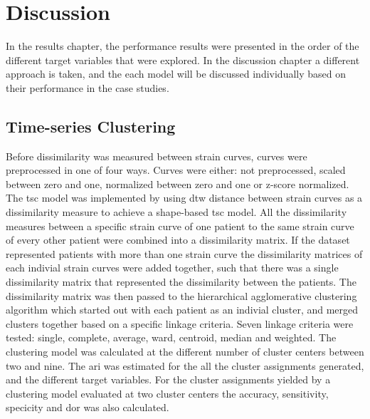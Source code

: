 \chapter{Discussion} \label{chap:discussion}

In the results chapter, the performance results were presented in the order of the different target variables that were explored. In the discussion chapter a different approach is taken, and the each model will be discussed individually based on their performance in the case studies.

\section{Time-series Clustering} \label{sec:disc_tsc}

Before dissimilarity was measured between strain curves, curves were preprocessed in one of four ways. 
Curves were either: not preprocessed, scaled between zero and one, normalized between zero and one or z-score normalized. The \acrshort{tsc} model was implemented by using \acrshort{dtw} distance between strain curves as a dissimilarity measure to achieve a shape-based \acrshort{tsc} model. All the dissimilarity measures between a specific strain curve of one patient to the same strain curve of every other patient were combined into a dissimilarity matrix. If the dataset represented patients with more than one strain curve the dissimilarity matrices of each indivial strain curves were added together, such that there was a single dissimilarity matrix that represented the dissimilarity between the patients. The dissimilarity matrix was then passed to the hierarchical agglomerative clustering algorithm which started out with each patient as an indivial cluster, and merged clusters together based on a specific linkage criteria. Seven linkage criteria were tested: single, complete, average, ward, centroid, median and weighted. The clustering model was calculated at the different number of cluster centers between two and nine. The \acrshort{ari} was estimated for the all the cluster assignments generated, and the different target variables. For the cluster assignments yielded by a clustering model evaluated at two cluster centers the accuracy, sensitivity, specicity and \acrshort{dor} was also calculated. \bigskip

